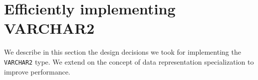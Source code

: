 \documentclass[twoside,11pt,a4paper]{article}
\newcommand{\pls}[1]{\small\texttt{#1}\normalsize}
\newcommand{\plstype}[1]{\pls{#1}}
\newcommand{\varchar}{\plstype{VARCHAR2}}
\newcommand{\startsection}[1]{
	\cleardoublepage
	\section{#1}
	\thispagestyle{basic}
}
\begin{document}

\startsection{Efficiently implementing VARCHAR2}
\label{sec:varcharimpl}

We describe in this section the design decisions we took for implementing the \varchar{} type. We extend on the concept of data representation specialization to improve performance.

\end{document}
